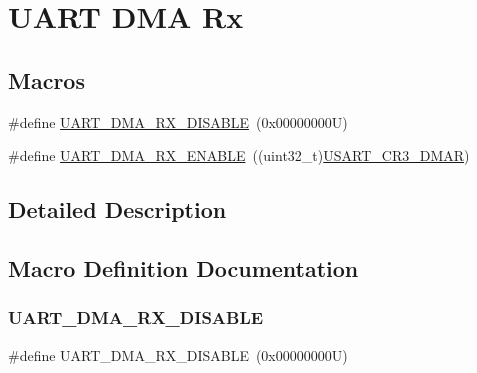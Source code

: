 \hypertarget{group___u_a_r_t___d_m_a___rx}{}\section{U\+A\+RT D\+MA Rx}
\label{group___u_a_r_t___d_m_a___rx}
\subsection*{Macros}
\begin{DoxyCompactItemize}
\item 
\#define \hyperlink{group___u_a_r_t___d_m_a___rx_gac65987cb4d8fd5da0f7dc695312f6afa}{U\+A\+R\+T\+\_\+\+D\+M\+A\+\_\+\+R\+X\+\_\+\+D\+I\+S\+A\+B\+LE}~(0x00000000\+U)
\item 
\#define \hyperlink{group___u_a_r_t___d_m_a___rx_gab871994de6d36a02b8ec34af197dff1d}{U\+A\+R\+T\+\_\+\+D\+M\+A\+\_\+\+R\+X\+\_\+\+E\+N\+A\+B\+LE}~((uint32\+\_\+t)\hyperlink{group___peripheral___registers___bits___definition_gaff130f15493c765353ec2fd605667c5a}{U\+S\+A\+R\+T\+\_\+\+C\+R3\+\_\+\+D\+M\+AR})
\end{DoxyCompactItemize}


\subsection{Detailed Description}


\subsection{Macro Definition Documentation}
\mbox{\label{group___u_a_r_t___d_m_a___rx_gac65987cb4d8fd5da0f7dc695312f6afa}} 
\subsubsection{\texorpdfstring{U\+A\+R\+T\+\_\+\+D\+M\+A\+\_\+\+R\+X\+\_\+\+D\+I\+S\+A\+B\+LE}{UART\_DMA\_RX\_DISABLE}}
{\footnotesize\ttfamily \#define U\+A\+R\+T\+\_\+\+D\+M\+A\+\_\+\+R\+X\+\_\+\+D\+I\+S\+A\+B\+LE~(0x00000000\+U)}

